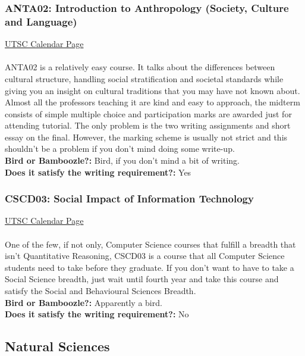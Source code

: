 \documentclass[11pt]{article}
\begin{document}
\subsubsection{ANTA02: Introduction to Anthropology (Society, Culture and Language)}
\href{https://utsc.calendar.utoronto.ca/course/ANTA02H3}{UTSC Calendar Page}\\\\
ANTA02 is a relatively easy course. It talks about the differences between cultural structure, handling social stratification and societal standards while giving you an insight on cultural traditions that you may have not known about. Almost all the professors teaching it are kind and easy to approach, the midterm consists of simple multiple choice and participation marks are awarded just for attending tutorial. The only problem is the two writing assignments and short essay on the final. However, the marking scheme is usually not strict and this shouldn't be a problem if you don't mind doing some write-up.\\

\textbf{Bird or Bamboozle?:} Bird, if you don't mind a bit of writing.\\

\textbf{Does it satisfy the writing requirement?:} Yes

\subsubsection{CSCD03: Social Impact of Information Technology}
\href{https://utsc.calendar.utoronto.ca/course/CSCD03H3}{UTSC Calendar Page}\\\\
One of the few, if not only, Computer Science courses that fulfill a breadth that isn't Quantitative Reasoning, CSCD03 is a course that all Computer Science students need to take before they graduate.  If you don't want to have to take a Social Science breadth, just wait until fourth year and take this course and satisfy the Social and Behavioural Sciences Breadth.\\

\textbf{Bird or Bamboozle?:} Apparently a bird.\\

\textbf{Does it satisfy the writing requirement?:} No

\subsection{Natural Sciences}
\end{document}
